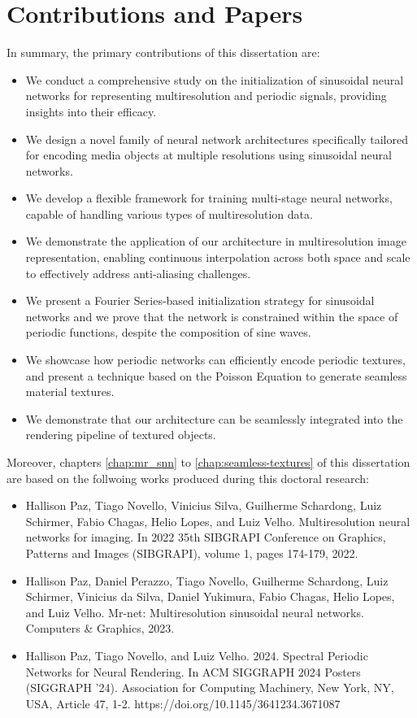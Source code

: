 \section{Contributions and Papers}

In summary, the primary contributions of this dissertation are:

\begin{itemize}
    \item We conduct a comprehensive study on the initialization of sinusoidal neural networks for representing multiresolution and periodic signals, providing insights into their efficacy.
    \item We design a novel family of neural network architectures specifically tailored for encoding media objects at multiple resolutions using sinusoidal neural networks.
    \item We develop a flexible framework for training multi-stage neural networks, capable of handling various types of multiresolution data.
    \item We demonstrate the application of our architecture in multiresolution image representation, enabling continuous interpolation across both space and scale to effectively address anti-aliasing challenges.
    \item We present a Fourier Series-based initialization strategy for sinusoidal networks and we prove that the network is constrained within the space of periodic functions, despite the composition of sine waves.
    \item We showcase how periodic networks can efficiently encode periodic textures, and present a technique based on the Poisson Equation to generate seamless material textures.
    \item We demonstrate that our architecture can be seamlessly integrated into the  rendering pipeline of textured objects.
\end{itemize}

Moreover, chapters \ref{chap:mr_snn} to \ref{chap:seamless-textures} of this dissertation are based on the follwoing works produced during this doctoral research:

\begin{itemize}
    \item Hallison Paz, Tiago Novello, Vinicius Silva, Guilherme Schardong, Luiz Schirmer, Fabio Chagas, Helio Lopes, and Luiz Velho. Multiresolution neural networks for imaging. In 2022 35th SIBGRAPI Conference on Graphics, Patterns and Images (SIBGRAPI), volume 1, pages 174-179, 2022.
    \item Hallison Paz, Daniel Perazzo, Tiago Novello, Guilherme Schardong, Luiz Schirmer, Vinicius da Silva, Daniel Yukimura, Fabio Chagas, Helio Lopes, and Luiz Velho. Mr-net: Multiresolution sinusoidal neural networks. Computers \& Graphics, 2023.
    \item Hallison Paz, Tiago Novello, and Luiz Velho. 2024. Spectral Periodic Networks for Neural Rendering. In ACM SIGGRAPH 2024 Posters (SIGGRAPH '24). Association for Computing Machinery, New York, NY, USA, Article 47, 1-2. https://doi.org/10.1145/3641234.3671087
\end{itemize}

